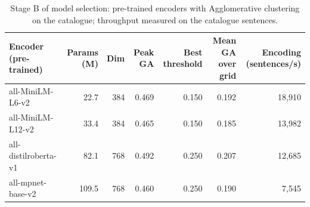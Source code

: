 \begin{table}[t]
\centering
\caption{Stage B of model selection: pre-trained encoders with Agglomerative clustering on the catalogue; throughput measured on the catalogue sentences.}
\label{tab:selection_embeddings}
\small
\begin{tabular}{lrrrrrr}
\toprule
Encoder (pre-trained) & Params (M) & Dim & Peak GA & Best threshold & Mean GA over grid & Encoding (sentences/s) \\
\midrule
all-MiniLM-L6-v2 & 22.7 & 384 & 0.469 & 0.150 & 0.192 & 18,910 \\
all-MiniLM-L12-v2 & 33.4 & 384 & 0.465 & 0.150 & 0.185 & 13,982 \\
all-distilroberta-v1 & 82.1 & 768 & 0.492 & 0.250 & 0.207 & 12,685 \\
all-mpnet-base-v2 & 109.5 & 768 & 0.460 & 0.250 & 0.190 & 7,545 \\
\bottomrule
\end{tabular}
\end{table}